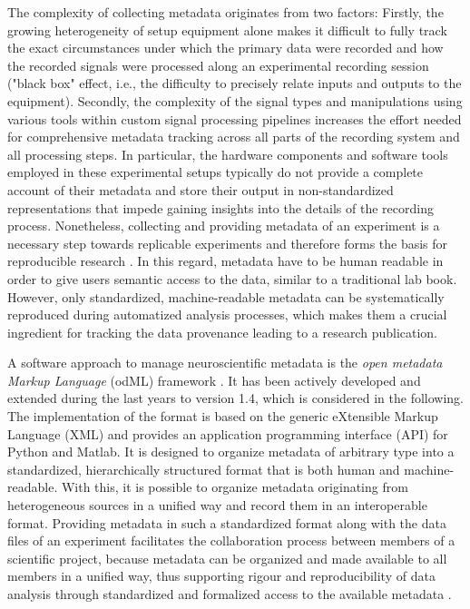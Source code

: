 The complexity of collecting metadata originates from two factors: Firstly, the growing heterogeneity of setup equipment alone makes it difficult to fully track the exact circumstances under which the primary data were recorded and how the recorded signals were processed along an experimental recording session ("black box" effect, i.e., the difficulty to precisely relate inputs and outputs to the equipment). Secondly, the complexity of the signal types and manipulations using various tools within custom signal processing pipelines increases the effort needed for comprehensive metadata tracking across all parts of the recording system and all processing steps. In particular, the hardware components and software tools employed in these experimental setups typically do not provide a complete account of their metadata and store their output in non-standardized representations that impede gaining insights into the details of the recording process. Nonetheless, collecting and providing metadata of an experiment is a necessary step towards replicable experiments and therefore forms the basis for reproducible research \citep{Tebaykin_2017}. In this regard, metadata have to be human readable in order to give users semantic access to the data, similar to a traditional lab book. However, only standardized, machine-readable metadata can be systematically reproduced during automatized analysis processes, which makes them a crucial ingredient for tracking the data provenance leading to a research publication.

A software approach to manage neuroscientific metadata is the \textit{open metadata Markup Language} (odML) framework \citep{Grewe_2011}. It has been actively developed and extended during the last years to version 1.4, which is considered in the following. The implementation of the  format is based on the generic eXtensible Markup Language (XML) and provides an application programming interface (API) for Python and Matlab. It is designed to organize metadata of arbitrary type into a standardized, hierarchically structured format that is both human and machine-readable. With this, it is possible to organize metadata originating from heterogeneous sources in a unified way and record them in an interoperable format. Providing metadata in such a standardized format along with the data files of an experiment facilitates the collaboration process between members of a scientific project, because metadata can be organized and made available to all members in a unified way, thus supporting rigour and reproducibility of data analysis through standardized and formalized access to the available metadata \citep{Zehl_2016}.

